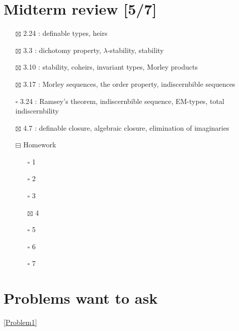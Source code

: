 \documentclass[11pt]{article}
\begin{document}
\section{Midterm review [5/7]}
\label{sec:org5aafcab}
\begin{itemize}
\item[{$\boxtimes$}] 2.24 : definable types, heirs
\item[{$\boxtimes$}] 3.3 : dichotomy property, \(\lambda\)-stability, stability
\item[{$\boxtimes$}] 3.10 : stability, coheirs, invariant types, Morley products
\item[{$\boxtimes$}] 3.17 : Morley sequences, the order property, indiscernbible sequences
\item[{$\square$}] 3.24 : Ramsey's theorem, indiscernbible sequence, EM-types, total indiscernbility
\item[{$\boxtimes$}] 4.7 : definable closure, algebraic closure, elimination of imaginaries
\item[{$\boxminus$}] Homework
\begin{itemize}
\item[{$\square$}] 1
\item[{$\square$}] 2
\item[{$\square$}] 3
\item[{$\boxtimes$}] 4
\item[{$\square$}] 5
\item[{$\square$}] 6
\item[{$\square$}] 7
\end{itemize}
\end{itemize}

\section{Problems want to ask}
\label{sec:orgceca354}
\ref{Problem1}
\end{document}

